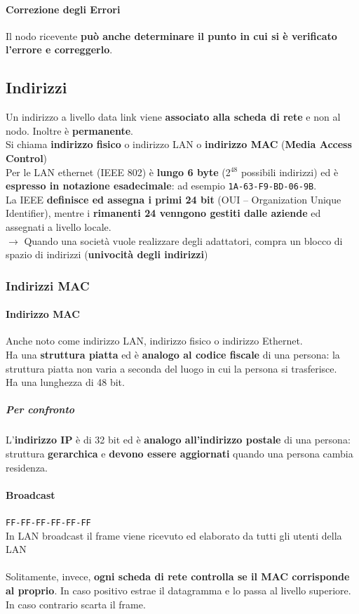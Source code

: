 \documentclass[10pt]{article}
\begin{document}
\paragraph{Correzione degli Errori} Il nodo ricevente \textbf{può anche determinare il punto in cui si è verificato l'errore e correggerlo}.
\subsection{Indirizzi}
Un indirizzo a livello data link viene \textbf{associato alla scheda di rete} e non al nodo. Inoltre è \textbf{permanente}.\\
Si chiama \textbf{indirizzo fisico} o indirizzo LAN o \textbf{indirizzo MAC} (\textbf{Media Access Control})\\
	Per le LAN ethernet (IEEE 802) è \textbf{lungo 6 byte} (2$^{48}$ possibili indirizzi) ed è \textbf{espresso in notazione esadecimale}: ad esempio \texttt{1A-63-F9-BD-06-9B}.\\
	La IEEE \textbf{definisce ed assegna i primi 24 bit} (OUI -- Organization Unique Identifier), mentre i \textbf{rimanenti 24 venngono gestiti dalle aziende} ed assegnati a livello locale.\\
	$\rightarrow$ Quando una società vuole realizzare degli adattatori, compra un blocco di spazio di indirizzi (\textbf{univocità degli indirizzi})
\subsubsection{Indirizzi MAC}
\paragraph{Indirizzo MAC} Anche noto come indirizzo LAN, indirizzo fisico o indirizzo Ethernet.\\
Ha una \textbf{struttura piatta} ed è \textbf{analogo al codice fiscale} di una persona: la struttura piatta non varia a seconda del luogo in cui la persona si trasferisce.\\
Ha una lunghezza di 48 bit.
\subparagraph{Per confronto} L'\textbf{indirizzo IP} è di 32 bit ed è \textbf{analogo all'indirizzo postale} di una persona: struttura \textbf{gerarchica} e \textbf{devono essere aggiornati} quando una persona cambia residenza.
\paragraph{Broadcast} \texttt{FF-FF-FF-FF-FF-FF}\\
In LAN broadcast il frame viene ricevuto ed elaborato da tutti gli utenti della LAN\\\\
Solitamente, invece, \textbf{ogni scheda di rete controlla se il MAC corrisponde al proprio}. In caso positivo estrae il datagramma e lo passa al livello superiore.\\
In caso contrario scarta il frame.
\end{document}

